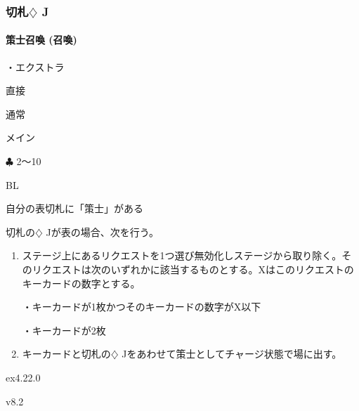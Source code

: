 \documentclass[letterpaper,10pt,dvipdfmx]{sphinxmanual}
\begin{document}
\subsubsection{切札{\normalsize $\diamondsuit$} J}
\label{\detokenize{auto/frameActionlist:id64}}

\paragraph{策士召喚 (召喚)}
\label{\detokenize{auto/frameActionlist:act-summonstrategist}}\label{\detokenize{auto/frameActionlist:id65}}
\sphinxAtStartPar
{}

\sphinxAtStartPar
・エクストラ

\sphinxAtStartPar
{} 直接

\sphinxAtStartPar
{} 通常

\sphinxAtStartPar
{} メイン

\sphinxAtStartPar
{} {\normalsize $\clubsuit$} 2〜10

\sphinxAtStartPar
{} BL

\sphinxAtStartPar
{}

\sphinxAtStartPar
自分の表切札に「策士」がある

\sphinxAtStartPar
{}

\sphinxAtStartPar
切札の{\normalsize $\diamondsuit$} Jが表の場合、次を行う。
\begin{enumerate}
%
\item {} 
\sphinxAtStartPar
ステージ上にあるリクエストを1つ選び無効化しステージから取り除く。そのリクエストは次のいずれかに該当するものとする。Xはこのリクエストのキーカードの数字とする。

\sphinxAtStartPar
・キーカードが1枚かつそのキーカードの数字がX以下

\sphinxAtStartPar
・キーカードが2枚

\item {} 
\sphinxAtStartPar
キーカードと切札の{\normalsize $\diamondsuit$} Jをあわせて策士としてチャージ状態で場に出す。

\end{enumerate}

\sphinxAtStartPar
{}  ex4.22.0

\sphinxAtStartPar
{}  v8.2
\end{document}

